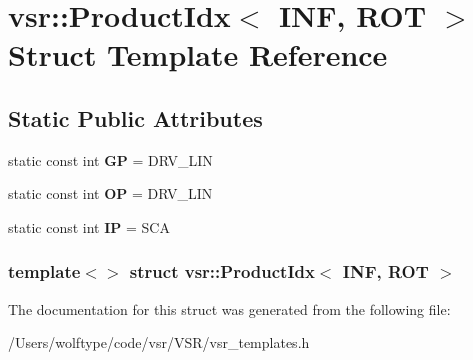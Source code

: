 \hypertarget{structvsr_1_1_product_idx_3_01_i_n_f_00_01_r_o_t_01_4}{\section{vsr\-:\-:Product\-Idx$<$ I\-N\-F, R\-O\-T $>$ Struct Template Reference}
\label{structvsr_1_1_product_idx_3_01_i_n_f_00_01_r_o_t_01_4}
}
\subsection*{Static Public Attributes}
\begin{DoxyCompactItemize}
\item 
\hypertarget{structvsr_1_1_product_idx_3_01_i_n_f_00_01_r_o_t_01_4_a80006a14e745913b52c021f0c7c5143b}{static const int {\bfseries G\-P} = D\-R\-V\-\_\-\-L\-I\-N}\label{structvsr_1_1_product_idx_3_01_i_n_f_00_01_r_o_t_01_4_a80006a14e745913b52c021f0c7c5143b}

\item 
\hypertarget{structvsr_1_1_product_idx_3_01_i_n_f_00_01_r_o_t_01_4_adc707ccc14c5ee6661d99e6ff04536bd}{static const int {\bfseries O\-P} = D\-R\-V\-\_\-\-L\-I\-N}\label{structvsr_1_1_product_idx_3_01_i_n_f_00_01_r_o_t_01_4_adc707ccc14c5ee6661d99e6ff04536bd}

\item 
\hypertarget{structvsr_1_1_product_idx_3_01_i_n_f_00_01_r_o_t_01_4_a716c9d0ad17d43e00bbf5e70fcbdf1df}{static const int {\bfseries I\-P} = S\-C\-A}\label{structvsr_1_1_product_idx_3_01_i_n_f_00_01_r_o_t_01_4_a716c9d0ad17d43e00bbf5e70fcbdf1df}

\end{DoxyCompactItemize}
\subsubsection*{template$<$$>$ struct vsr\-::\-Product\-Idx$<$ I\-N\-F, R\-O\-T $>$}



The documentation for this struct was generated from the following file\-:\begin{DoxyCompactItemize}
\item 
/\-Users/wolftype/code/vsr/\-V\-S\-R/vsr\-\_\-templates.\-h\end{DoxyCompactItemize}
